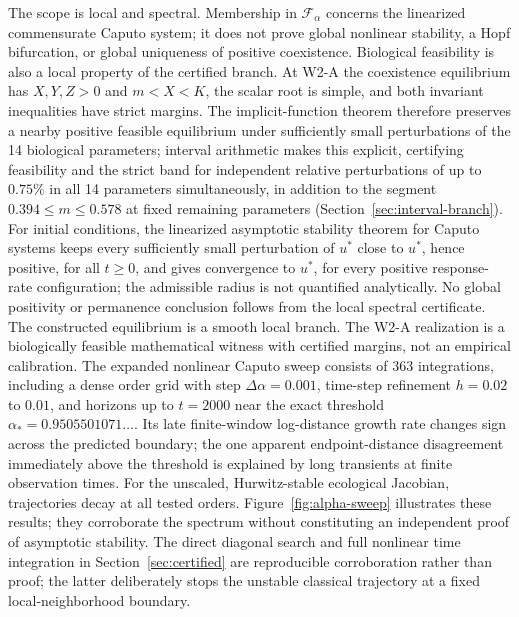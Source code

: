 The scope is local and spectral. Membership in \(\mathcal F_\alpha\) concerns the linearized commensurate Caputo system; it does not prove global nonlinear stability, a Hopf bifurcation, or global uniqueness of positive coexistence. Biological feasibility is also a local property of the certified branch. At W2-A the coexistence equilibrium has \(X,Y,Z>0\) and \(m<X<K\), the scalar root is simple, and both invariant inequalities have strict margins. The implicit-function theorem therefore preserves a nearby positive feasible equilibrium under sufficiently small perturbations of the 14 biological parameters; interval arithmetic makes this explicit, certifying feasibility and the strict band for independent relative perturbations of up to \(0.75\%\) in all 14 parameters simultaneously, in addition to the segment \(0.394\le m\le0.578\) at fixed remaining parameters (Section~\ref{sec:interval-branch}). For initial conditions, the linearized asymptotic stability theorem for Caputo systems \cite{CongDoanSiegmundTuan2016} keeps every sufficiently small perturbation of \(u^*\) close to \(u^*\), hence positive, for all \(t\ge0\), and gives convergence to \(u^*\), for every positive response-rate configuration; the admissible radius is not quantified analytically. No global positivity or permanence conclusion follows from the local spectral certificate. The constructed equilibrium is a smooth local branch. The W2-A realization is a biologically feasible mathematical witness with certified margins, not an empirical calibration. The expanded nonlinear Caputo sweep consists of 363 integrations, including a dense order grid with step \(\Delta\alpha=0.001\), time-step refinement \(h=0.02\) to \(0.01\), and horizons up to \(t=2000\) near the exact threshold \(\alpha_*=0.9505501071\ldots\). Its late finite-window log-distance growth rate changes sign across the predicted boundary; the one apparent endpoint-distance disagreement immediately above the threshold is explained by long transients at finite observation times. For the unscaled, Hurwitz-stable ecological Jacobian, trajectories decay at all tested orders. Figure~\ref{fig:alpha-sweep} illustrates these results; they corroborate the spectrum without constituting an independent proof of asymptotic stability. The direct diagonal search and full nonlinear time integration in Section~\ref{sec:certified} are reproducible corroboration rather than proof; the latter deliberately stops the unstable classical trajectory at a fixed local-neighborhood boundary.


